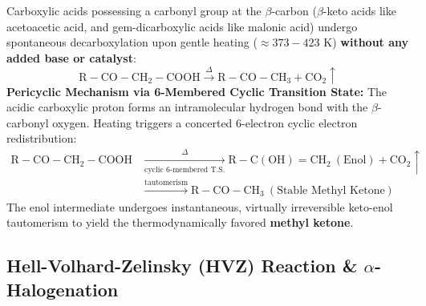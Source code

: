 \documentclass[10pt,a4paper]{article}
\begin{document}
\begin{conceptbox}
Carboxylic acids possessing a carbonyl group at the $\beta$-carbon ($\beta$-keto acids like acetoacetic acid, and gem-dicarboxylic acids like malonic acid) undergo spontaneous decarboxylation upon gentle heating ($\approx 373-423\text{ K}$) \textbf{without any added base or catalyst}:
\begin{equation}
  \mathrm{R-CO-CH_2-COOH} \xrightarrow{\Delta} \mathrm{R-CO-CH_3} + \mathrm{CO_2}\uparrow
\end{equation}
\textbf{Pericyclic Mechanism via 6-Membered Cyclic Transition State:}
The acidic carboxylic proton forms an intramolecular hydrogen bond with the $\beta$-carbonyl oxygen. Heating triggers a concerted 6-electron cyclic electron redistribution:
\begin{align}
  \mathrm{R-CO-CH_2-COOH} &\xrightarrow[\text{cyclic 6-membered T.S.}]{\Delta} \mathrm{R-C(OH)=CH_2} \ (\text{Enol}) + \mathrm{CO_2}\uparrow\\
  &\xrightarrow{\text{tautomerism}} \mathrm{R-CO-CH_3} \ (\text{Stable Methyl Ketone})
\end{align}
The enol intermediate undergoes instantaneous, virtually irreversible keto-enol tautomerism to yield the thermodynamically favored \textbf{methyl ketone}.
\end{conceptbox}

\subsection{Hell-Volhard-Zelinsky (HVZ) Reaction \& \texorpdfstring{$\alpha$}{alpha}-Halogenation}
\end{document}
